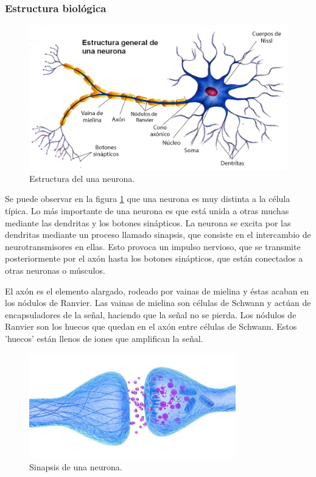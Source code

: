 \documentclass[12pt]{article}
\numberwithin{equation}{section}
\begin{document}
{\subsubsection{Estructura biológica}

\begin{figure}[h]
    \centering
    \includegraphics[width=1\textwidth]{estructura_general_neurona.png}
    \caption{Estructura del una neurona.}
    \label{fig:neuronareal}
\end{figure}

Se puede observar en la figura \ref{fig:neuronareal} que una neurona es muy distinta a la célula típica. Lo más importante de una neurona es que está unida a otras muchas mediante las dendritas y los botones sinápticos. La neurona se excita por las dendritas mediante un proceso llamado sinapsis, que consiste en el intercambio de neurotransmisores en ellas. Esto provoca un impulso nervioso, que se transmite posteriormente por el axón hasta los botones sinápticos, que están conectados a otras neuronas o músculos.

El axón es el elemento alargado, rodeado por vainas de mielina y éstas acaban en los nódulos de Ranvier. Las vainas de mielina son células de Schwann y actúan de encapsuladores de la señal, haciendo que la señal no se pierda. Los nódulos de Ranvier son los huecos que quedan en el axón entre células de Schwann. Estos 'huecos' están llenos de iones que amplifican la señal.

\begin{figure}[h]
    \centering
    \includegraphics[width=0.8\textwidth]{sinapsis.jpg}
    \caption{Sinapsis de una neurona.}
    \label{fig:mesh2}
\end{figure}

}
\end{document}
